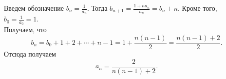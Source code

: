 \documentclass{article}
\begin{document}
Введем обозначение $b_n = \frac{1}{a_n}$. Тогда $b_{n+1} = \frac{1 + na_n}{a_n} = b_n + n$. Кроме того, $b_0 = \frac{1}{a_0} = 1$.\\
Получаем, что
$$b_n = b_0 + 1 + 2 + \cdots + n-1 = 1 + \frac{n(n-1)}{2} = \frac{n(n-1) + 2}{2}.$$
Отсюда получаем
$$a_n = \frac{2}{n(n-1)+2}.$$
\end{document}
